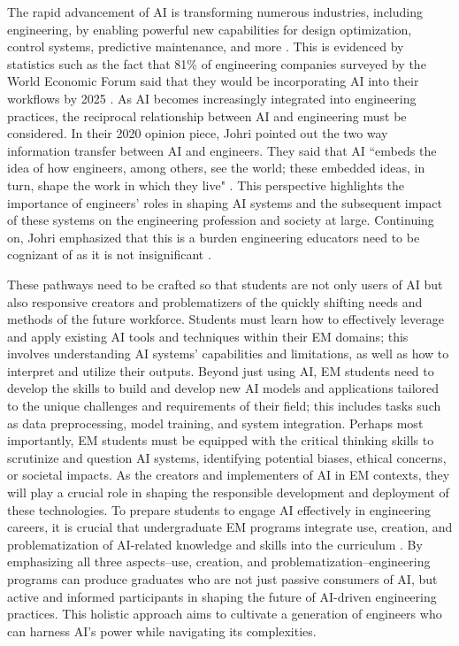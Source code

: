 \documentclass[11pt]{article}
\begin{document}
The rapid advancement of AI is transforming numerous industries, including engineering, by enabling powerful new capabilities for design optimization, control systems, predictive maintenance, and more \cite{xxx}.
This is evidenced by statistics such as the fact that 81\% of engineering companies surveyed by the World Economic Forum said that they would be incorporating AI into their workflows by 2025 \cite{WEF2020}.
As AI becomes increasingly integrated into engineering practices, the reciprocal relationship between AI and engineering must be considered.
In their 2020 opinion piece, Johri pointed out the two way information transfer between AI and engineers.  They said that AI ``embeds the idea of how engineers, among others, see the world; these embedded ideas, in turn, shape the work in which they live"  \cite{johri2020artificial}.
This perspective highlights the importance of engineers' roles in shaping AI systems and the subsequent impact of these systems on the engineering profession and society at large.
Continuing on, Johri emphasized that this is a burden engineering educators need to be cognizant of as it is not insignificant \cite{johri2020artificial}.

These pathways need to be crafted so that students are not only users of AI but also responsive creators and problematizers of the quickly shifting needs and methods of the future workforce. 
Students must learn how to effectively leverage and apply existing AI tools and techniques within their EM domains; this involves understanding AI systems' capabilities and limitations, as well as how to interpret and utilize their outputs.
Beyond just using AI, EM students need to develop the skills to build and develop new AI models and applications tailored to the unique challenges and requirements of their field; this includes tasks such as data preprocessing, model training, and system integration. 
Perhaps most importantly, EM students must be equipped with the critical thinking skills to scrutinize and question AI systems, identifying potential biases, ethical concerns, or societal impacts. As the creators and implementers of AI in EM contexts, they will play a crucial role in shaping the responsible development and deployment of these technologies.
To prepare students to engage AI effectively in engineering careers, it is crucial that undergraduate EM programs integrate use, creation, and problematization of AI-related knowledge and skills into the curriculum \cite{xxx}. 
By emphasizing all three aspects--use, creation, and problematization--engineering programs can produce graduates who are not just passive consumers of AI, but active and informed participants in shaping the future of AI-driven engineering practices. 
This holistic approach aims to cultivate a generation of engineers who can harness AI's power while navigating its complexities.
\end{document}
